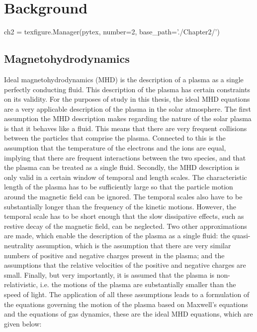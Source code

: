\chapter{Background}\label{ch:background}  %

\begin{pycode}[chapter2]
ch2 = texfigure.Manager(pytex, number=2, base_path='./Chapter2/')
\end{pycode}

\section{Magnetohydrodynamics}\label{sec:MHD}

Ideal magnetohydrodynamics (MHD) is the description of a plasma as a single perfectly conducting fluid.
This description of the plasma has certain constraints on its validity.
For the purposes of study in this thesis, the ideal MHD equations are a very applicable description of the plasma in the solar atmosphere.
The first assumption the MHD description makes regarding the nature of the solar plasma is that it behaves like a fluid.
This means that there are very frequent collisions between the particles that comprise the plasma.
Connected to this is the assumption that the temperature of the electrons and the ions are equal, implying that there are frequent interactions between the two species, and that the plasma can be treated as a single fluid.
Secondly, the MHD description is only valid in a certain window of temporal and length scales.
The characteristic length of the plasma has to be sufficiently large so that the particle motion around the magnetic field can be ignored.
The temporal scales also have to be substantially longer than the frequency of the kinetic motions.
However, the temporal scale has to be short enough that the slow dissipative effects, such as restive decay of the magnetic field, can be neglected.
Two other approximations are made, which enable the description of the plasma as a single fluid: the quasi-neutrality assumption, which is the assumption that there are very similar numbers of positive and negative charges present in the plasma; and the assumptions that the relative velocities of the positive and negative charges are small.
Finally, but very importantly, it is assumed that the plasma is non-relativistic, i.e. the motions of the plasma are substantially smaller than the speed of light.
The application of all these assumptions leads to a formulation of the equations governing the motion of the plasma based on Maxwell's equations and the equations of gas dynamics, these are the ideal MHD equations, which are given below:
\newcommand{\condev}{\left(\frac{\partial}{\partial t} + \vec{v}\cdot\nabla\right)}

